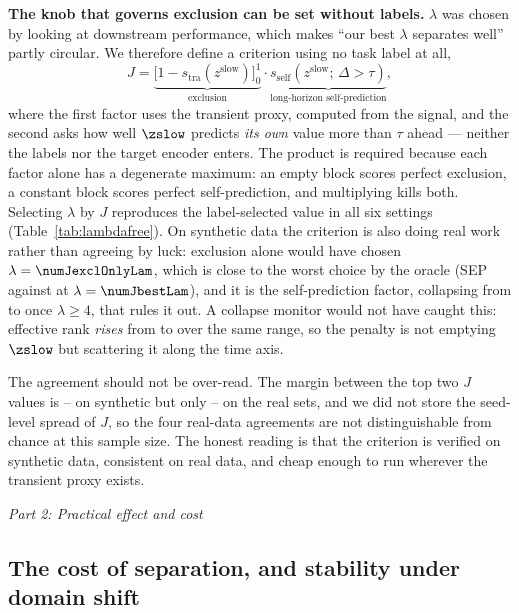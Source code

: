 \textbf{The knob that governs exclusion can be set without labels.} $\lambda$ was chosen by looking at downstream performance, which makes ``our best $\lambda$ separates well'' partly circular. We therefore define a criterion using no task label at all,
\begin{equation}
J = \underbrace{\big[1-s_{\text{tra}}(z^{\mathrm{slow}})\big]_0^1}_{\text{exclusion}} \cdot
    \underbrace{s_{\text{self}}(z^{\mathrm{slow}};\,\Delta>\tau)}_{\text{long-horizon self-prediction}},
\label{eq:J}
\end{equation}
where the first factor uses the transient proxy, computed from the signal, and the second asks how well $\zslow$ predicts \emph{its own} value more than $\tau$ ahead --- neither the labels nor the target encoder enters. The product is required because each factor alone has a degenerate maximum: an empty block scores perfect exclusion, a constant block scores perfect self-prediction, and multiplying kills both. Selecting $\lambda$ by $J$ reproduces the label-selected value in all six settings (Table~\ref{tab:lambdafree}). On synthetic data the criterion is also doing real work rather than agreeing by luck: exclusion alone would have chosen $\lambda=\numJexclOnlyLam$, which is close to the worst choice by the oracle (SEP \numJexclOnlySep{} against \numJbestSep{} at $\lambda=\numJbestLam$), and it is the self-prediction factor, collapsing from \numJlongBest{} to \numJlongCollapse{} once $\lambda\ge4$, that rules it out. A collapse monitor would not have caught this: effective rank \emph{rises} from \numJrankLo{} to \numJrankHi{} over the same range, so the penalty is not emptying $\zslow$ but scattering it along the time axis.



The agreement should not be over-read. The margin between the top two $J$ values is \numJmarginSynthLo--\numJmarginSynthHi{} on synthetic but only \numJmarginRealLo--\numJmarginRealHi{} on the real sets, and we did not store the seed-level spread of $J$, so the four real-data agreements are not distinguishable from chance at this sample size. The honest reading is that the criterion is verified on synthetic data, consistent on real data, and cheap enough to run wherever the transient proxy exists.

\medskip
\noindent\textit{Part 2: Practical effect and cost}

\subsection{The cost of separation, and stability under domain shift}
\label{sec:cost}

